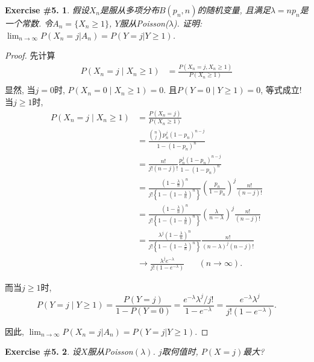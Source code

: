 \documentclass[UTF8, a4paper]{article}
\newtheorem{exercise}{Exercise \#5.}
\begin{document}
\begin{framed}
\begin{exercise}
假设\(X_n\)是服从多项分布\(B(p_n, n)\)的随机变量, 且满足\(\lambda = np_n\)是一个常数.
令\(A_n = \{X_n \geq 1\}\), \(Y\)服从Poisson(\(\lambda\)). 证明: \(\lim_{n\to\infty} P(X_n = j | A_n) = P(Y = j | Y \geq 1)\).
\end{exercise}
\end{framed}

\begin{proof}
先计算
$$
\begin{aligned}
    P(X_n = j \mid X_n \geq 1) &= \frac{P(X_n = j, X_n \geq 1)}{P(X_n \geq 1)} \\
\end{aligned}
$$
显然, 当\(j = 0\)时, \(P(X_n = 0 \mid X_n \geq 1) = 0\). 
且\(P(Y = 0 \mid Y\geq 1) = 0\), 等式成立!
当\(j \geq 1\)时,
$$
\begin{aligned}
    P(X_n = j \mid X_n \geq 1) &= \frac{P(X_n = j)}{P(X_n \geq 1)} \\
    &= \frac{\binom{n}{j}p_n^j(1-p_n)^{n-j}}{1 - (1-p_n)^n} \\
    &= \frac{n!}{j!(n-j)!} \frac{p_n^j(1-p_n)^{n-j}}{1 - (1-p_n)^n} \\
    &= \frac{\left(1 - \frac{\lambda}{n}\right)^n}{j!\left\{1 - \left(1 - \frac{\lambda}{n}\right)^n\right\}} \left(\frac{p_n}{1-p_n}\right)^j \frac{n!}{(n-j)!} \\
    &= \frac{\left(1 - \frac{\lambda}{n}\right)^n}{j!\left\{1 - \left(1 - \frac{\lambda}{n}\right)^n\right\}} \left(\frac{\lambda}{n - \lambda}\right)^j \frac{n!}{(n-j)!} \\
    &= \frac{\lambda^j \left(1 - \frac{\lambda}{n}\right)^n}{j!\left\{1 - \left(1 - \frac{\lambda}{n}\right)^n\right\}}  \frac{n!}{(n - \lambda)^j(n-j)!} \\
    & \to \frac{\lambda^j e^{-\lambda}}{j!(1 - e^{-\lambda})} \quad \text{ } (n\to \infty).
\end{aligned}
$$


而当\(j\geq 1\)时, 
$$
P(Y = j \mid Y \geq 1) = \frac{P(Y = j)}{1 - P(Y = 0)} = \frac{e^{-\lambda}\lambda^j/j!}{1 - e^{-\lambda}} = \frac{e^{-\lambda}\lambda^j}{j!(1 - e^{-\lambda})}.
$$

因此, \(\lim_{n\to\infty} P(X_n = j | A_n) = P(Y = j | Y \geq 1)\).
\end{proof}

\begin{framed}
\begin{exercise}
    设\(X\)服从Poisson\((\lambda)\). \(j\)取何值时, \(P(X = j)\)最大?
\end{exercise}
\end{framed}
\end{document}
